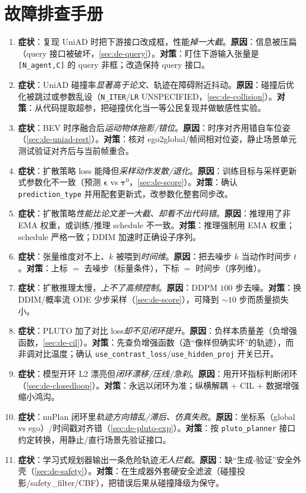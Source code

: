\section*{故障排查手册}
\begin{enumerate}
  \item \textbf{症状}：复现 UniAD 时把下游接口改成框，性能\emph{掉一大截}。\textbf{原因}：信息被压扁（query 接口被破坏，\cref{sec:de-query}）。\textbf{对策}：盯住下游输入张量是 \texttt{[N\_agent,C]} 的 query 非框；改造保持 query 接口。
  \item \textbf{症状}：UniAD 碰撞率\emph{显著高于论文}、轨迹在障碍附近抖动。\textbf{原因}：碰撞后优化被跳过或参数乱设（\texttt{N\_ITER}/\allowbreak\texttt{LR} UNSPECIFIED，\cref{sec:de-collision}）。\textbf{对策}：从代码提取超参，把碰撞优化当一等公民复现并做敏感性实验。
  \item \textbf{症状}：BEV 时序融合后\emph{运动物体拖影/错位}。\textbf{原因}：时序对齐用错自车位姿（\cref{sec:de-uniad-rest}）。\textbf{对策}：核对 ego2global/帧间相对位姿，静止场景单元测试验证对齐后与当前帧重合。
  \item \textbf{症状}：扩散策略 loss 能降但\emph{采样动作发散/退化}。\textbf{原因}：训练目标与采样更新式参数化不一致（预测 $\boldsymbol{\epsilon}$ vs $\boldsymbol{\tau}^0$，\cref{sec:de-score}）。\textbf{对策}：确认 \texttt{prediction\_type} 并用配套更新式，改参数化整套同步改。
  \item \textbf{症状}：扩散策略\emph{性能比论文差一大截、却看不出代码错}。\textbf{原因}：推理用了非 EMA 权重，或训练/推理 schedule 不一致。\textbf{对策}：推理强制用 EMA 权重；schedule 严格一致；DDIM 加速时正确设子序列。
  \item \textbf{症状}：张量维度对不上、$k$ 被喂到\emph{时间维}。\textbf{原因}：把去噪步 $k$ 当动作时间步 $t$。\textbf{对策}：上标 $=$ 去噪步（标量条件），下标 $=$ 时间步（序列维）。
  \item \textbf{症状}：扩散推理太慢，\emph{上不了高频控制}。\textbf{原因}：DDPM $100$ 步去噪。\textbf{对策}：换 DDIM/概率流 ODE 少步采样（\cref{sec:de-score}），可降到 $\sim 10$ 步而质量损失小。
  \item \textbf{症状}：PLUTO 加了对比 loss\emph{却不见闭环提升}。\textbf{原因}：负样本质量差（负增强函数，\cref{sec:de-cil}）。\textbf{对策}：先查负增强函数（造“像样但确实坏”的轨迹），而非调对比温度；确认 \texttt{use\_contrast\_loss}/\allowbreak\texttt{use\_hidden\_proj} 开关已开。
  \item \textbf{症状}：模型开环 L2 漂亮但\emph{闭环漂移/压线/急刹}。\textbf{原因}：用开环指标判断闭环（\cref{sec:de-closedloop}）。\textbf{对策}：永远以闭环为准；纵横解耦 $+$ CIL $+$ 数据增强缩小鸿沟。
  \item \textbf{症状}：nuPlan 闭环里\emph{轨迹方向错乱/滞后、仿真失败}。\textbf{原因}：坐标系（global vs ego）/时间戳对齐错（\cref{sec:de-pluto-exp}）。\textbf{对策}：按 \texttt{pluto\_planner} 接口约定转换，用静止/直行场景先验证接口。
  \item \textbf{症状}：学习式规划器输出一条危险轨迹\emph{无人拦截}。\textbf{原因}：缺“生成-验证”安全外壳（\cref{sec:de-safety}）。\textbf{对策}：在生成器外套硬安全滤波（碰撞投影/safety\_filter/CBF），把错误后果从碰撞降级为保守。
\end{enumerate}
